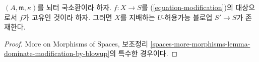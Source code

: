 \begin{lemma}
\label{lemma-dominate-by-admissible-blowup}
$(A, \mathfrak m, \kappa)$를 뇌터 국소환이라 하자.
$f : X \to S$를 (\ref{equation-modification})의 대상으로서
$f$가 고유인 것이라 하자. 그러면 $X$를 지배하는
$U$-허용가능 블로업 $S' \to S$가 존재한다.
\end{lemma}

\begin{proof}
More on Morphisms of Spaces, 보조정리
\ref{spaces-more-morphisms-lemma-dominate-modification-by-blowup}의 특수한 경우이다.
\end{proof}









